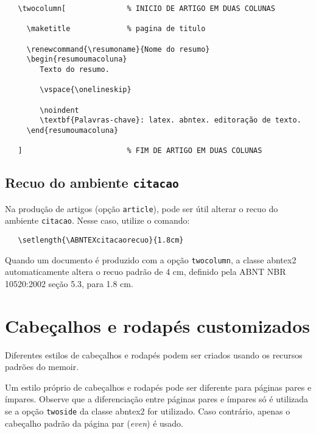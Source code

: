 \documentclass[
	article,			%
	11pt,				%
	oneside,			%
	a4paper,			%
	chapter=TITLE,		%
	english,			%
	brazil,				%
	sumario=tradicional
	]{abntex2}
\begin{document}
\begin{verbatim}
   \twocolumn[              % INICIO DE ARTIGO EM DUAS COLUNAS

     \maketitle             % pagina de titulo

     \renewcommand{\resumoname}{Nome do resumo}
     \begin{resumoumacoluna}
        Texto do resumo.
      
        \vspace{\onelineskip}
 
        \noindent
        \textbf{Palavras-chave}: latex. abntex. editoração de texto.
     \end{resumoumacoluna}
   
   ]                        % FIM DE ARTIGO EM DUAS COLUNAS
\end{verbatim}

\subsection*{Recuo do ambiente \texttt{citacao}}

Na produção de artigos (opção \texttt{article}), pode ser útil alterar o recuo
do ambiente \texttt{citacao}. Nesse caso, utilize o comando:

\begin{verbatim}
   \setlength{\ABNTEXcitacaorecuo}{1.8cm}
\end{verbatim}

Quando um documento é produzido com a opção \texttt{twocolumn}, a classe
\textsf{abntex2} automaticamente altera o recuo padrão de 4 cm, definido pela
ABNT NBR 10520:2002 seção 5.3, para 1.8 cm.

\section*{Cabeçalhos e rodapés customizados}

Diferentes estilos de cabeçalhos e rodapés podem ser criados usando os recursos
padrões do \textsf{memoir}.

Um estilo próprio de cabeçalhos e rodapés pode ser diferente para páginas pares
e ímpares. Observe que a diferenciação entre páginas pares e ímpares só é
utilizada se a opção \texttt{twoside} da classe \textsf{abntex2} for utilizado.
Caso contrário, apenas o cabeçalho padrão da página par (\emph{even}) é usado.
\end{document}
